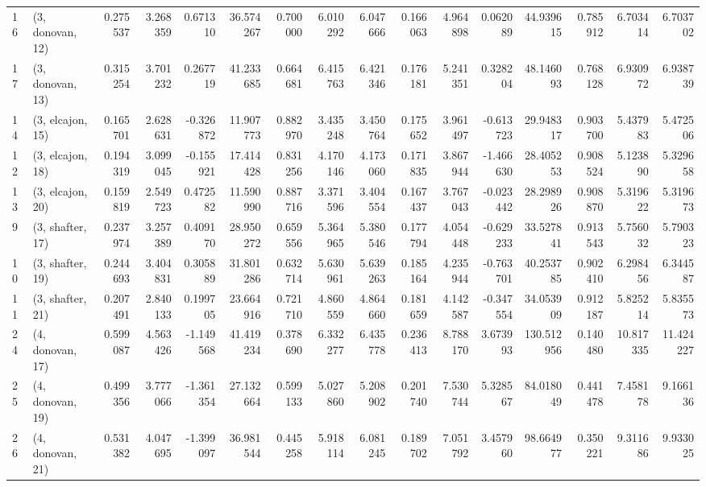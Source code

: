 \begin{tabular}{llrrrrrrrrrrrrrr}
16 &  (3, donovan, 12) &   0.275537 &  3.268359 &  0.671310 &  36.574267 &  0.700000 &   6.010292 &  6.047666 &  0.166063 &  4.964898 &  0.062089 &   44.939615 &  0.785912 &   6.703414 &   6.703702 \\
17 &  (3, donovan, 13) &   0.315254 &  3.701232 &  0.267719 &  41.233685 &  0.664681 &   6.415763 &  6.421346 &  0.176181 &  5.241351 &  0.328204 &   48.146093 &  0.768128 &   6.930972 &   6.938739 \\
14 &  (3, elcajon, 15) &   0.165701 &  2.628631 & -0.326872 &  11.907773 &  0.882970 &   3.435248 &  3.450764 &  0.175652 &  3.961497 & -0.613723 &   29.948317 &  0.903700 &   5.437983 &   5.472506 \\
12 &  (3, elcajon, 18) &   0.194319 &  3.099045 & -0.155921 &  17.414428 &  0.831256 &   4.170146 &  4.173060 &  0.171835 &  3.867944 & -1.466630 &   28.405253 &  0.908524 &   5.123890 &   5.329658 \\
13 &  (3, elcajon, 20) &   0.159819 &  2.549723 &  0.472582 &  11.590990 &  0.887716 &   3.371596 &  3.404554 &  0.167437 &  3.767043 & -0.023442 &   28.298926 &  0.908870 &   5.319622 &   5.319673 \\
9  &  (3, shafter, 17) &   0.237974 &  3.257389 &  0.409170 &  28.950272 &  0.659556 &   5.364965 &  5.380546 &  0.177794 &  4.054448 & -0.629233 &   33.527841 &  0.913543 &   5.756032 &   5.790323 \\
10 &  (3, shafter, 19) &   0.244693 &  3.404831 &  0.305889 &  31.801286 &  0.632714 &   5.630961 &  5.639263 &  0.185164 &  4.235944 & -0.763701 &   40.253785 &  0.902410 &   6.298456 &   6.344587 \\
11 &  (3, shafter, 21) &   0.207491 &  2.840133 &  0.199705 &  23.664916 &  0.721710 &   4.860559 &  4.864660 &  0.181659 &  4.142587 & -0.347554 &   34.053909 &  0.912187 &   5.825214 &   5.835573 \\
24 &  (4, donovan, 17) &   0.599087 &  4.563426 & -1.149568 &  41.419234 &  0.378690 &   6.332277 &  6.435778 &  0.236413 &  8.788170 &  3.673993 &  130.512956 &  0.140480 &  10.817335 &  11.424227 \\
25 &  (4, donovan, 19) &   0.499356 &  3.777066 & -1.361354 &  27.132664 &  0.599133 &   5.027860 &  5.208902 &  0.201740 &  7.530744 &  5.328567 &   84.018049 &  0.441478 &   7.458178 &   9.166136 \\
26 &  (4, donovan, 21) &   0.531382 &  4.047695 & -1.399097 &  36.981544 &  0.445258 &   5.918114 &  6.081245 &  0.189702 &  7.051792 &  3.457960 &   98.664977 &  0.350221 &   9.311686 &   9.933025 \\

\end{tabular}
